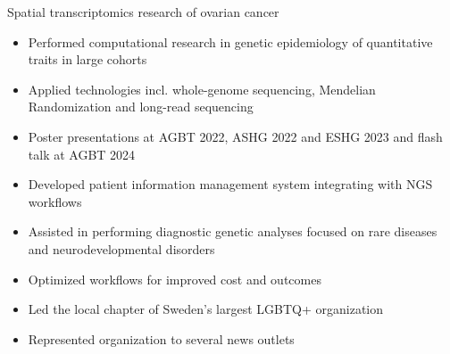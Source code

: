\documentclass[10pt,a4paper,ragged2e,withhyper]{altacv}
\begin{document}
\begin{paracol}{2}

\divider

{\small Spatial transcriptomics research of ovarian cancer}

\divider

\begin{itemize}
  \item Performed computational research in genetic epidemiology of quantitative traits in large cohorts
  \item Applied technologies incl. whole-genome sequencing, Mendelian Randomization and long-read sequencing
  \item Poster presentations at AGBT 2022, ASHG 2022 and ESHG 2023 and flash talk at AGBT 2024
\end{itemize}
\divider

\begin{itemize}
  \item Developed patient information management system integrating with NGS workflows
  \item Assisted in performing diagnostic genetic analyses focused on rare diseases and neurodevelopmental disorders
  \item Optimized workflows for improved cost and outcomes
\end{itemize}


\begin{itemize}
  \item Led the local chapter of Sweden's largest LGBTQ+ organization
  \item Represented organization to several news outlets
\end{itemize}


\end{paracol}
\end{document}
